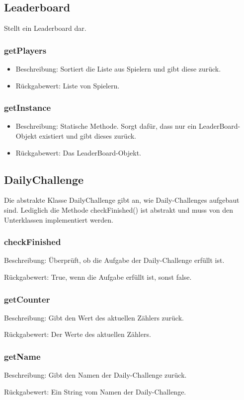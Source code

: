 \documentclass[a4paper]{scrreprt}
\begin{document}
   
   \subsection{Leaderboard}
   Stellt ein Leaderboard dar.
   
   \subsubsection{getPlayers}
   \begin{itemize}
   	\item Beschreibung: Sortiert die Liste aus Spielern und gibt diese zurück.
   	\item Rückgabewert: Liste von Spielern.
   \end{itemize}
   \subsubsection{getInstance}
   \begin{itemize}
   	\item Beschreibung: Statische Methode. Sorgt dafür, dass nur ein LeaderBoard-Objekt existiert und gibt dieses zurück.
   	\item Rückgabewert: Das LeaderBoard-Objekt.
   \end{itemize}
   
   
   \subsection{DailyChallenge}
   Die abstrakte Klasse DailyChallenge gibt an, wie Daily-Challenges aufgebaut sind. Lediglich die Methode checkFinished() ist abstrakt und muss von den Unterklassen implementiert werden.
   \subsubsection{checkFinished}
     \item Beschreibung: Überprüft, ob die Aufgabe der Daily-Challenge erfüllt ist.
     \item Rückgabewert: True, wenn die Aufgabe erfüllt ist, sonst false.
   \subsubsection{getCounter}
     \item Beschreibung: Gibt den Wert des aktuellen Zählers zurück.
     \item Rückgabewert: Der Werte des aktuellen Zählers.
   \subsubsection{getName}
     \item Beschreibung: Gibt den Namen der Daily-Challenge zurück.
     \item Rückgabewert: Ein String vom Namen der Daily-Challenge.
\end{document}
